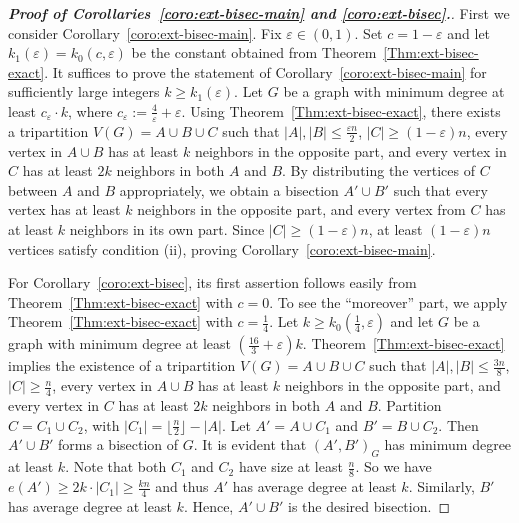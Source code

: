 \documentclass{aic}
\begin{document}
	\begin{proof}[\bf Proof of Corollaries~\ref{coro:ext-bisec-main} and \ref{coro:ext-bisec}.]
		First we consider Corollary~\ref{coro:ext-bisec-main}.
		Fix $\varepsilon\in (0,1)$.
		Set $c=1-\varepsilon$ and let $k_1(\varepsilon)=k_0(c,\varepsilon)$ be the constant obtained from Theorem~\ref{Thm:ext-bisec-exact}.
		It suffices to prove the statement of Corollary~\ref{coro:ext-bisec-main} for sufficiently large integers $k\geq k_1(\varepsilon)$.
		Let $G$ be a graph with minimum degree at least $c_\varepsilon\cdot k$, where $c_\varepsilon:=\frac{4}{\varepsilon}+\varepsilon$.
		Using Theorem~\ref{Thm:ext-bisec-exact}, there exists a tripartition $V(G)=A\cup B\cup C$ such that
		$|A|,|B|\leq \frac{\varepsilon n}{2}$, $|C|\geq (1-\varepsilon)n$,
		every vertex in $A\cup B$ has at least $k$ neighbors in the opposite part,
		and every vertex in $C$ has at least $2k$ neighbors in both $A$ and $B$.
		By distributing the vertices of $C$ between $A$ and $B$ appropriately, we obtain a bisection $A'\cup B'$
		such that every vertex has at least $k$ neighbors in the opposite part,
		and every vertex from $C$ has at least $k$ neighbors in its own part.
		Since $|C|\geq (1-\varepsilon)n$,
		at least $(1-\varepsilon)n$ vertices satisfy condition (ii), proving Corollary~\ref{coro:ext-bisec-main}.
		
		For Corollary~\ref{coro:ext-bisec}, its first assertion follows easily from Theorem~\ref{Thm:ext-bisec-exact} with $c=0$. 
        To see the ``moreover'' part, we apply Theorem~\ref{Thm:ext-bisec-exact} with $c=\frac14$.
		Let $k\geq k_0(\frac14,\varepsilon)$ and let $G$ be a graph with minimum degree at least $\left(\frac{16}{3} + \varepsilon\right)k$.
		Theorem~\ref{Thm:ext-bisec-exact} implies the existence of a tripartition $V(G)=A\cup B\cup C$ such that $|A|,|B|\leq \frac{3n}{8}$,
		$|C|\geq \frac{n}{4}$, every vertex in $A\cup B$ has at least $k$ neighbors in  the opposite part,
		and every vertex in $C$ has at least $2k$ neighbors in both $A$ and $B$.
		Partition $C=C_1\cup C_2$, with $|C_1|=\lfloor\frac{n}{2}\rfloor-|A|$.
		Let $A'=A\cup C_1$ and $B'=B\cup C_2$.
		Then $A'\cup B'$ forms a bisection of $G$.
		It is evident that $(A',B')_G$ has minimum degree at least $k$.
        Note that both $C_1$ and $C_2$ have size at least $\frac{n}{8}$. 
        So we have $e(A')\geq 2k\cdot |C_1|\geq \frac{kn}{4}$ and thus $A'$ has average degree at least $k$.
        Similarly, $B'$ has average degree at least $k$.
		Hence, $A'\cup B'$ is the desired bisection.
	\end{proof}
	
\end{document}
